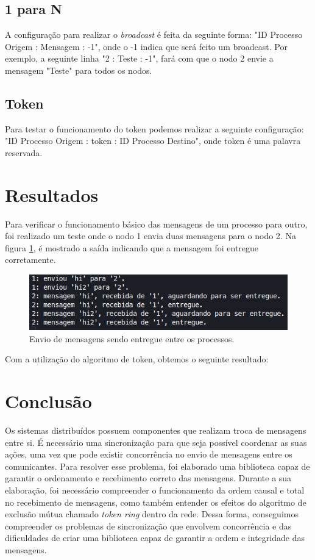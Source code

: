 \documentclass[
	12pt,				%
	openright,			%
	oneside,			%
	a4paper,			%
	english,			%
	french,				%
	spanish,			%
	brazil				%
	]{abntex2}
\begin{document}
\subsection{1 para N}
A configuração para realizar o \emph{broadcast} é feita da seguinte forma:
"ID Processo Origem : Mensagem : -1", onde o -1 indica que será feito um broadcast.
Por exemplo, a seguinte linha "2 : Teste : -1", fará com que o nodo 2 envie a mensagem "Teste" para
todos os nodos.

\subsection{Token}
Para testar o funcionamento do token podemos realizar a seguinte configuração:
"ID Processo Origem : token : ID Processo Destino", onde token é uma palavra reservada.


\section{Resultados}
Para verificar o funcionamento básico das mensagens de um processo para outro,
foi realizado um teste onde o nodo 1 envia
duas mensagens para o nodo 2. Na figura \ref{fig:confirmado}, é mostrado a saída
indicando que a mensagem foi entregue corretamente.

\begin{figure}[!h]
    \centering
    \includegraphics[scale=0.9]{confirmado.png}
    \caption{Envio de mensagens sendo entregue entre os processos.}
    \label{fig:confirmado}
\end{figure}

Com a utilização do algoritmo de token, obtemos o seguinte resultado:

\section{Conclusão}
Os sistemas distribuídos possuem componentes que realizam troca de mensagens entre si.
É necessário uma sincronização para que seja possível coordenar as suas ações,
uma vez que pode existir concorrência no envio de mensagens entre os comunicantes.
Para resolver esse problema, foi elaborado uma biblioteca capaz de garantir o ordenamento
e recebimento correto das mensagens. Durante a sua elaboração, foi necessário compreender
o funcionamento da ordem causal e total no recebimento de mensagens, como também 
entender os efeitos do algoritmo de exclusão mútua chamado \emph{token ring} dentro da rede.
Dessa forma, conseguimos compreender os problemas de sincronização que envolvem
concorrência e das dificuldades de criar uma biblioteca capaz de garantir a ordem e integridade das mensagens.
\end{document}
